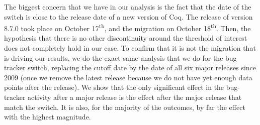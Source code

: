 \documentclass[conference]{IEEEtran}
\begin{document}
The biggest concern that we have in our analysis is the fact that the date of the switch is close to the release date of a new version of Coq. The release of version 8.7.0 took place on October 17\textsuperscript{th}, and the migration on October 18\textsuperscript{th}. Then, the hypothesis that there is no other discontinuity around the threshold of interest does not completely hold in our case.
To confirm that it is not the migration that is driving our results, we do the exact same analysis that we do for the bug tracker switch, replacing the cutoff date by the date of all six major releases since 2009 (once we remove the latest release because we do not have yet enough data points after the release). We show that the only significant effect in the bug-tracker activity after a major release is the effect after the major release that match the switch. It is also, for the majority of the outcomes, by far the effect with the highest magnitude. 


\end{document}
